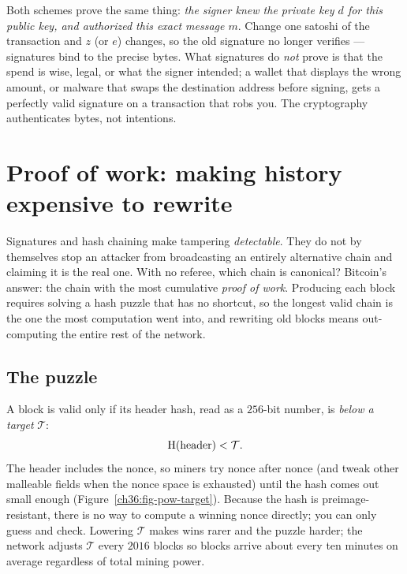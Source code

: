 \begin{focusbox}
Both schemes prove the same thing: \emph{the signer knew the private key $d$ for this public key, and authorized this exact message $m$}. Change one satoshi of the transaction and $z$ (or $e$) changes, so the old signature no longer verifies --- signatures bind to the precise bytes. What signatures do \emph{not} prove is that the spend is wise, legal, or what the signer intended; a wallet that displays the wrong amount, or malware that swaps the destination address before signing, gets a perfectly valid signature on a transaction that robs you. The cryptography authenticates bytes, not intentions.
\end{focusbox}

\section{Proof of work: making history expensive to rewrite}
\label{ch36:pow}

Signatures and hash chaining make tampering \emph{detectable}. They do not by themselves stop an attacker from broadcasting an entirely alternative chain and claiming it is the real one. With no referee, which chain is canonical? Bitcoin's answer: the chain with the most cumulative \emph{proof of work}. Producing each block requires solving a hash puzzle that has no shortcut, so the longest valid chain is the one the most computation went into, and rewriting old blocks means out-computing the entire rest of the network.

\subsection{The puzzle}
\label{ch36:puzzle}

A block is valid only if its header hash, read as a $256$-bit number, is \emph{below a target} $\mathcal{T}$:
\[
  \operatorname{H}(\text{header}) < \mathcal{T}.
\]
The header includes the nonce, so miners try nonce after nonce (and tweak other malleable fields when the nonce space is exhausted) until the hash comes out small enough (Figure~\ref{ch36:fig-pow-target}). Because the hash is preimage-resistant, there is no way to compute a winning nonce directly; you can only guess and check. Lowering $\mathcal{T}$ makes wins rarer and the puzzle harder; the network adjusts $\mathcal{T}$ every $2016$ blocks so blocks arrive about every ten minutes on average regardless of total mining power.

